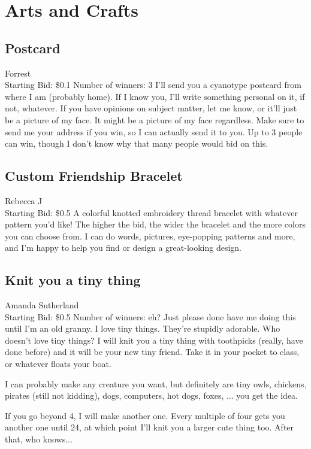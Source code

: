 \documentclass[11pt]{article}
\begin{document}
\section{Arts and Crafts}
\subsection{Postcard}
Forrest
\\
Starting Bid: \$0.1
\newline
Number of winners: 3
\newline
I'll send you a cyanotype postcard from where I am (probably home). If I know you, I'll write something personal on it, if not, whatever. If you have opinions on subject matter, let me know, or it'll just be a picture of my face. It might be a picture of my face regardless. Make sure to send me your address if you win, so I can actually send it to you. Up to 3 people can win, though I don't know why that many people would bid on this.
\subsection{Custom Friendship Bracelet}
Rebecca J
\\
Starting Bid: \$0.5
\newline
A colorful knotted embroidery thread bracelet with whatever pattern you'd like! The higher the bid, the wider the bracelet and the more colors you can choose from. I can do words, pictures, eye-popping patterns and more, and I'm happy to help you find or design a great-looking design.
\subsection{Knit you a tiny thing}
Amanda Sutherland
\\
Starting Bid: \$0.5
\newline
Number of winners: eh? Just please done have me doing this until I'm an old granny. 
\newline
I love tiny things. They're stupidly adorable. Who doesn't love tiny things? I will knit you a tiny thing with toothpicks (really, have done before) and it will be your new tiny friend. Take it in your pocket to class, or whatever floats your boat. 

I can probably make any creature you want, but definitely are tiny owls, chickens, pirates (still not kidding), dogs, computers, hot dogs, foxes, ... you get the idea. 

If you go beyond 4, I will make another one. Every multiple of four gets you another one until 24, at which point I'll knit you a larger cute thing too. After that, who knows...
\end{document}
